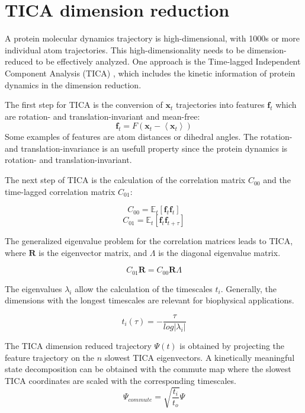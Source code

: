 \section{TICA dimension reduction}

A protein molecular dynamics trajectory is high-dimensional, with 1000s or more individual atom trajectories. This high-dimensionality needs to be dimension-reduced to be effectively analyzed. One approach is the Time-lagged
Independent Component Analysis (TICA) \cite{TICA1-perez2013, TICA2-schwantes2013}, which includes the kinetic information of protein dynamics in the dimension reduction.

The first step for TICA is the conversion of $\mathbf{x}_{t}$ trajectories into features $\mathbf{f}_{t}$ which are rotation- and translation-invariant and mean-free:
$$\mathbf{f}_{t}=F\left(\mathbf{x}_{t}-\left\langle \mathbf{x}_{t}\right\rangle \right)$$  
Some examples of features are atom distances or dihedral angles. The rotation- and translation-invariance is an usefull property since the protein dynamics is rotation- and translation-invariant.

The next step of TICA is the calculation of the correlation matrix $C_{00}$ and the time-lagged correlation matrix $C_{01}$:

$$C_{00}=\ensuremath{\mathbb{E}}_{t}\left[\mathbf{f}_{t}\mathbf{f}_{t}\right]$$
$$C_{01}=\ensuremath{\mathbb{E}}_{t}\left[\mathbf{f}_{t}\mathbf{f}_{t+\tau}\right]$$

The generalized eigenvalue problem for the correlation matrices leads to TICA, where $\mathbf{R}$ is the eigenvector matrix, and $\mathbf{\varLambda}$ is the diagonal eigenvalue matrix. 

$$C_{01}\mathbf{R}=C_{00}\mathbf{R}\mathbf{\varLambda}$$

The eigenvalues $\lambda_{i}$ allow the calculation of the timescales $t_{i}$. Generally, the dimensions with the longest timescales are relevant for biophysical applications.

$$t_{i}(\tau)=-\frac{\tau}{log\left|\lambda_{i}\right|}$$ 

The TICA dimension reduced trajectory $\varPsi(t)$ is obtained by projecting the feature trajectory on the $n$ slowest TICA eigenvectors. A kinetically meaningful state decomposition can be obtained with the commute map\cite{noe2016commute} where the slowest TICA coordinates are scaled with the corresponding timescales.
$$\varPsi_{commute}=\sqrt{\frac{t_{i}}{t_{o}}}\varPsi$$

